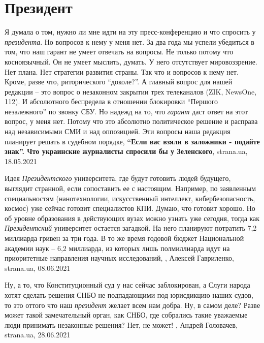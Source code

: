  
 
 
 
 
\chapter{Президент}
\label{sec:slova.prezident}

Я думала о том, нужно ли мне идти на эту пресс-конференцию и что спросить у
\emph{президента}. Но вопросов к нему у меня нет. За два года мы успели убедиться в
том, что наш гарант не умеет отвечать на вопросы. Не только потому что
косноязычный. Он не умеет мыслить, думать. У него отсутствует мировоззрение.
Нет плана. Нет стратегии развития страны. Так что и вопросов к нему нет. Кроме,
разве что, риторического \enquote{доколе?}.  А главный вопрос для нашей
редакции – это вопрос о незаконном закрытии трех телеканалов (ZIK, NewsOne,
112). И абсолютного беспредела в отношении блокировки \enquote{Першого
незалежного} по звонку СБУ. Но надежд на то, что \emph{гарант} даст ответ на этот
вопрос, у меня нет. Потому что это абсолютно политическое решение и расправа
над независимыми СМИ и над оппозицией. Эти вопросы наша редакция планирует
решать в судебном порядке,
\textbf{\enquote{Если вас взяли в заложники - подайте знак}. Что украинские журналисты спросили бы у Зеленского},
strana.ua, 18.05.2021

Идея \emph{Президентского} университета, где будут готовить людей будущего,
выглядит странной, если сопоставить ее с настоящим. Например, по заявленным
специальностям (нанотехнологии, искусственный интеллект, кибербезопасность,
космос) уже сейчас готовит специалистов КПИ. Думаю, что готовит хорошо. Но об
уровне образования в действующих вузах можно узнать уже сегодня, тогда как
\emph{Президентский} университет остается загадкой.  На него планируют
потратить 7,2 миллиарда гривен за три года. В то же время годовой бюджет
Национальной академии наук – 6,2 миллиарда, из которых лишь полмиллиарда идут
на приоритетные направления научных исследований,
, Алексей Гавриленко, strana.ua, 08.06.2021


Ну, а то, что Конституционный суд у нас сейчас заблокирован, а Слуги народа
хотят сделать решения СНБО не подпадающими под юрисдикцию наших судов, то это
оттого что наш \emph{президент} желает всем нам добра. Ну, в самом деле? Разве
может такой замечательный орган, как СНБО, где собрались такие уважаемые люди
принимать незаконные решения? Нет, не может!
, 
Андрей Головачев, strana.ua, 28.06.2021

